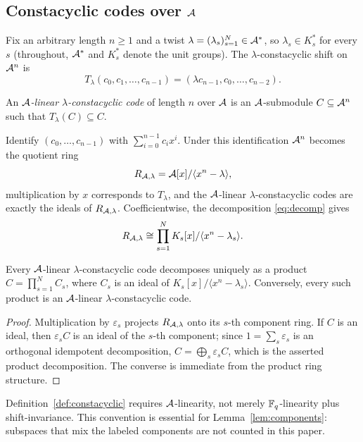 \subsection{Constacyclic codes over \texorpdfstring{$\mathcal A$}{A}}\label{sec:codes}

Fix an arbitrary length $n\geq1$ and a twist
$\lambda=(\lambda_s)_{s=1}^{N}\in\mathcal A^\ast$, so $\lambda_s\in K_s^\ast$ for every
$s$ (throughout, $\mathcal A^\ast$ and $K_s^\ast$ denote the unit groups).  The $\lambda$-constacyclic shift on $\mathcal A^n$ is
\[
T_\lambda(c_0,c_1,\ldots,c_{n-1})
   =(\lambda c_{n-1},c_0,\ldots,c_{n-2}).
\]

\begin{definition}\label{def:constacyclic}
An \emph{$\mathcal A$-linear $\lambda$-constacyclic code} of length $n$ over $\mathcal A$ is an
$\mathcal A$-submodule $C\subseteq\mathcal A^n$ such that $T_\lambda(C)\subseteq C$.
\end{definition}

Identify $(c_0,\ldots,c_{n-1})$ with $\sum_{i=0}^{n-1}c_ix^i$.  Under this
identification $\mathcal A^n$ becomes the quotient ring
\[
R_{\mathcal A,\lambda}=\mathcal A[x]/\langle x^n-\lambda\rangle,
\]
multiplication by $x$ corresponds to $T_\lambda$, and the $\mathcal A$-linear
$\lambda$-constacyclic codes are exactly the ideals of $R_{\mathcal A,\lambda}$.
Coefficientwise, the decomposition \eqref{eq:decomp} gives
\[
R_{\mathcal A,\lambda}\cong\prod_{s=1}^{N}K_s[x]/\langle x^n-\lambda_s\rangle .
\]

\begin{lemma}\label{lem:components}
Every $\mathcal A$-linear $\lambda$-constacyclic code decomposes uniquely as a product
$C=\prod_{s=1}^{N}C_s$, where $C_s$ is an ideal of
$K_s[x]/\langle x^n-\lambda_s\rangle$.  Conversely, every such product is an
$\mathcal A$-linear $\lambda$-constacyclic code.
\end{lemma}

\begin{proof}
Multiplication by $\varepsilon_s$ projects $R_{\mathcal A,\lambda}$ onto its $s$-th
component ring.  If $C$ is an ideal, then $\varepsilon_s C$ is an ideal of the
$s$-th component; since $1=\sum_s\varepsilon_s$ is an orthogonal idempotent
decomposition, $C=\bigoplus_s\varepsilon_s C$, which is the asserted product
decomposition.  The converse is immediate from the product ring structure.
\end{proof}

\begin{remark}\label{rem:Alinear}
Definition~\ref{def:constacyclic} requires $\mathcal A$-linearity, not merely
$\mathbb F_q$-linearity plus shift-invariance.  This convention is essential for
Lemma~\ref{lem:components}: subspaces that mix the labeled components are
not counted in this paper.
\end{remark}

